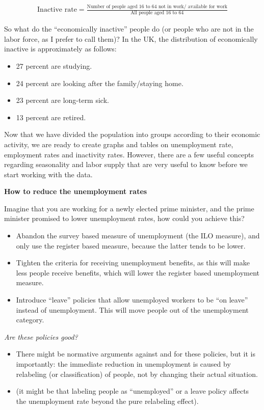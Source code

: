 \documentclass[]{book}
\providecommand{\tightlist}{%
  \setlength{\itemsep}{0pt}\setlength{\parskip}{0pt}}
\newenvironment{myblock}%
{%
 \begin{tcolorbox}%
}%
{\end{tcolorbox}}%
\begin{document}
\begin{align}
  \text{Inactive rate}=\frac{\text{Number of people aged 16 to 64 not in work/ available for work}}{\text{All people aged 16 to 64}}
\end{align}

So what do the ``economically inactive'' people do (or people who are not in the labor force, as I prefer to call them)? In the UK, the distribution of economically inactive is approximately as follows:

\begin{itemize}
\tightlist
\item
  27 percent are studying.
\item
  24 percent are looking after the family/staying home.
\item
  23 percent are long-term sick.
\item
  13 percent are retired.
\end{itemize}

Now that we have divided the population into groups according to their economic activity, we are ready to create graphs and tables on unemployment rate, employment rates and inactivity rates. However, there are a few useful concepts regarding seasonality and labor supply that are very useful to know before we start working with the data.

\begin{myblock}
\textbf{How to reduce the unemployment rates}

Imagine that you are working for a newly elected prime minister, and the
prime minister promised to lower unemployment rates, how could you
achieve this?

\begin{itemize}
\item
  Abandon the survey based measure of unemployment (the ILO measure),
  and only use the register based measure, because the latter tends to
  be lower.
\item
  Tighten the criteria for receiving unemployment benefits, as this will
  make less people receive benefits, which will lower the register based
  unemployment measure.
\item
  Introduce ``leave'' policies that allow unemployed workers to be ``on
  leave'' instead of unemployment. This will move people out of the
  unemployment category.
\end{itemize}

\emph{Are these policies good?}

\begin{itemize}
\tightlist
\item
  There might be normative arguments against and for these policies, but
  it is importantly: the immediate reduction in unemployment is caused
  by relabeling (or classification) of people, not by changing their
  actual situation.
\item
  (it might be that labeling people as ``unemployed'' or a leave policy
  affects the unemployment rate beyond the pure relabeling effect).
\end{itemize}
\end{myblock}
\end{document}
